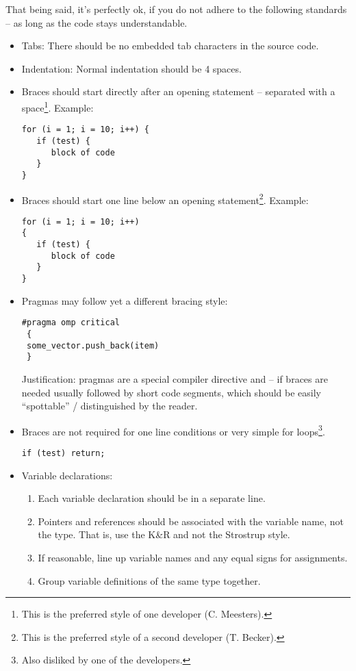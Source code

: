 {That being said, it's perfectly ok, if you do not adhere to the following standards -- as long as the code stays understandable.

\begin{itemize}
 \item Tabs: There should be no embedded tab characters in the source code.
 \item Indentation: Normal indentation should be 4 spaces.
 \item Braces should start directly after an opening statement -- separated with a space\footnote{This is the preferred style of one developer (C. Meesters).}. Example:
\begin{lstlisting}[style=C++]
for (i = 1; i = 10; i++) {
   if (test) {
      block of code
   } 
}
\end{lstlisting}
\item Braces should start one line below an opening statement\footnote{This is the preferred style of a second developer (T. Becker).}. Example:
\begin{lstlisting}[style=C++]
for (i = 1; i = 10; i++)
{
   if (test) {
      block of code
   } 
}
\end{lstlisting}
 \item Pragmas may follow yet a different bracing style:
\begin{lstlisting}[style=C++]
 #pragma omp critical
 {
 some_vector.push_back(item)
 }
\end{lstlisting}
Justification: pragmas are a special compiler directive and -- if braces are needed usually followed by short code segments, which should be easily ``spottable'' / distinguished by the reader.
 \item Braces are not required for one line conditions or very simple for loops\footnote{Also disliked by one of the developers.}. 
\begin{lstlisting}[style=C++]
if (test) return;
\end{lstlisting}
 \item Variable declarations:
 \begin{enumerate}
   \item Each variable declaration should be in a separate line.
   \item Pointers and references should be associated with the variable name, not the type. That is, use the K\&R and not the Strostrup style.
   \item If reasonable, line up variable names and any equal signs for assignments.
   \item Group variable definitions of the same type together.

\end{enumerate}
\end{itemize}}
